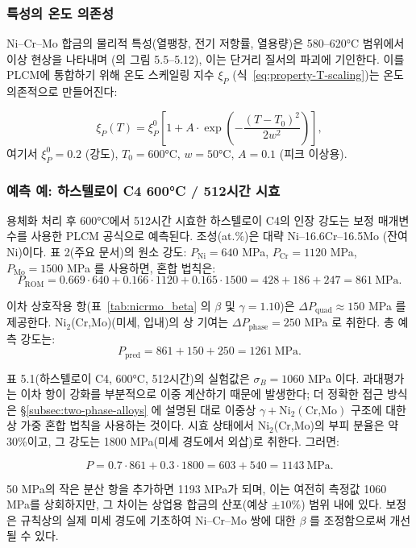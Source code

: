 \documentclass[12pt,a4paper]{article}
\begin{document}
	\subsubsection{특성의 온도 의존성}
	Ni–Cr–Mo 합금의 물리적 특성(열팽창, 전기 저항률, 열용량)은 580–620°C 범위에서 이상 현상을 나타내며 (\cite{dis2025}의 그림 5.5–5.12), 이는 단거리 질서의 파괴에 기인한다. 이를 PLCM에 통합하기 위해 온도 스케일링 지수 $\xi_P$ (식~\ref{eq:property-T-scaling})는 온도 의존적으로 만들어진다:
	
	\[
	\xi_P(T) = \xi_P^0 \left[1 + A \cdot \exp\left(-\frac{(T-T_0)^2}{2w^2}\right)\right],
	\]
	여기서 $\xi_P^0 = 0.2$ (강도), $T_0 = 600$°C, $w = 50$°C, $A = 0.1$ (피크 이상용).
	
	\subsubsection{예측 예: 하스텔로이 C4 600°C / 512시간 시효}
	용체화 처리 후 600°C에서 512시간 시효한 하스텔로이 C4의 인장 강도는 보정 매개변수를 사용한 PLCM 공식으로 예측된다. 조성(at.\%)은 대략 Ni–16.6Cr–16.5Mo (잔여 Ni)이다. 표 2(주요 문서)의 원소 강도: $P_{\text{Ni}}=640$ MPa, $P_{\text{Cr}}=1120$ MPa, $P_{\text{Mo}}=1500$ MPa 를 사용하면, 혼합 법칙은:
	\[
	P_{\text{ROM}} = 0.669\cdot640 + 0.166\cdot1120 + 0.165\cdot1500 = 428 + 186 + 247 = 861\ \text{MPa}.
	\]
	
	이차 상호작용 항(표~\ref{tab:nicrmo_beta} 의 $\beta$ 및 $\gamma=1.10$)은 $\Delta P_{\text{quad}} \approx 150$ MPa 를 제공한다. Ni$_2$(Cr,Mo)(미세, 입내)의 상 기여는 $\Delta P_{\text{phase}} = 250$ MPa 로 취한다. 총 예측 강도는:
	\[
	P_{\text{pred}} = 861 + 150 + 250 = 1261\ \text{MPa}.
	\]
	
	표 5.1(하스텔로이 C4, 600°C, 512시간)의 실험값은 $\sigma_B = 1060$ MPa 이다. 과대평가는 이차 항이 강화를 부분적으로 이중 계산하기 때문에 발생한다; 더 정확한 접근 방식은 \S\ref{subsec:two-phase-alloys} 에 설명된 대로 이중상 $\gamma + \text{Ni}_2(\text{Cr,Mo})$ 구조에 대한 상 가중 혼합 법칙을 사용하는 것이다. 시효 상태에서 Ni$_2$(Cr,Mo)의 부피 분율은 약 30\%이고, 그 강도는 1800 MPa(미세 경도에서 외삽)로 취한다. 그러면:
	
	\[
	P = 0.7\cdot861 + 0.3\cdot1800 = 603 + 540 = 1143\ \text{MPa}.
	\]
	
	50 MPa의 작은 분산 항을 추가하면 1193 MPa가 되며, 이는 여전히 측정값 1060 MPa를 상회하지만, 그 차이는 상업용 합금의 산포(예상 $\pm10\%$) 범위 내에 있다. 보정은 규칙상의 실제 미세 경도에 기초하여 Ni–Cr–Mo 쌍에 대한 $\beta$ 를 조정함으로써 개선될 수 있다.
	
\end{document}
